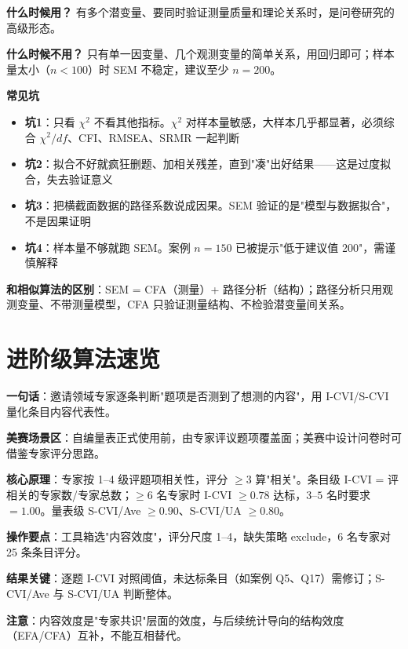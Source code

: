 \begin{algonotes}
\textbf{什么时候用？} 有多个潜变量、要同时验证测量质量和理论关系时，是问卷研究的高级形态。

\textbf{什么时候不用？} 只有单一因变量、几个观测变量的简单关系，用回归即可；样本量太小（$n<100$）时 SEM 不稳定，建议至少 $n=200$。

\textbf{常见坑}
\begin{itemize}
    \item \textbf{坑1}：只看 $\chi^2$ 不看其他指标。$\chi^2$ 对样本量敏感，大样本几乎都显著，必须综合 $\chi^2/df$、CFI、RMSEA、SRMR 一起判断
    \item \textbf{坑2}：拟合不好就疯狂删题、加相关残差，直到"凑"出好结果——这是过度拟合，失去验证意义
    \item \textbf{坑3}：把横截面数据的路径系数说成因果。SEM 验证的是"模型与数据拟合"，不是因果证明
    \item \textbf{坑4}：样本量不够就跑 SEM。案例 $n=150$ 已被提示"低于建议值 200"，需谨慎解释
\end{itemize}

\textbf{和相似算法的区别}：SEM = CFA（测量）+ 路径分析（结构）；路径分析只用观测变量、不带测量模型，CFA 只验证测量结构、不检验潜变量间关系。
\end{algonotes}

\section{进阶级算法速览}


\begin{algobrief}
\textbf{一句话}：邀请领域专家逐条判断"题项是否测到了想测的内容"，用 I-CVI/S-CVI 量化条目内容代表性。

\textbf{美赛场景区}：自编量表正式使用前，由专家评议题项覆盖面；美赛中设计问卷时可借鉴专家评分思路。

\textbf{核心原理}：专家按 1--4 级评题项相关性，评分 $\geq 3$ 算"相关"。条目级 I-CVI = 评相关的专家数/专家总数；$\geq 6$ 名专家时 I-CVI $\geq 0.78$ 达标，$3$--$5$ 名时要求 $=1.00$。量表级 S-CVI/Ave $\geq 0.90$、S-CVI/UA $\geq 0.80$。

\textbf{操作要点}：工具箱选"内容效度"，评分尺度 1--4，缺失策略 exclude，6 名专家对 25 条条目评分。

\textbf{结果关键}：逐题 I-CVI 对照阈值，未达标条目（如案例 Q5、Q17）需修订；S-CVI/Ave 与 S-CVI/UA 判断整体。

\textbf{注意}：内容效度是"专家共识"层面的效度，与后续统计导向的结构效度（EFA/CFA）互补，不能互相替代。
\end{algobrief}

